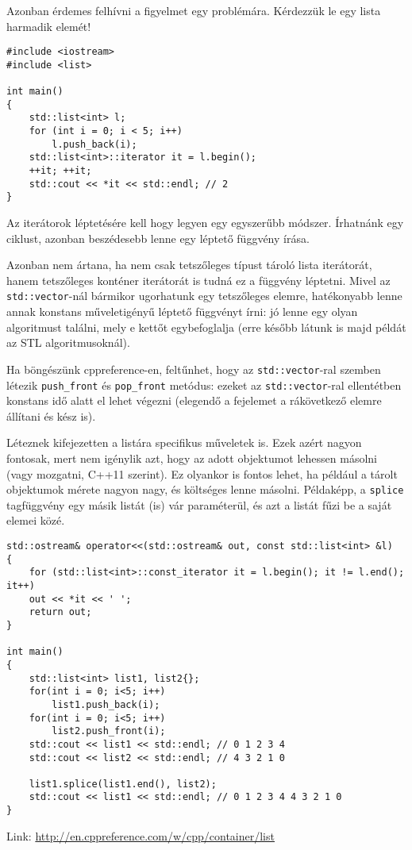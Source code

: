 \documentclass[a4paper,11.5pt,table]{article}
\begin{document}
	Azonban érdemes felhívni a figyelmet egy problémára. Kérdezzük le egy lista harmadik elemét!
	\begin{lstlisting}
#include <iostream>
#include <list>

int main()
{
	std::list<int> l;
	for (int i = 0; i < 5; i++)
		l.push_back(i);
	std::list<int>::iterator it = l.begin();
	++it; ++it;
	std::cout << *it << std::endl; // 2
}
	\end{lstlisting}	
	Az iterátorok léptetésére kell hogy legyen egy egyszerűbb módszer. Írhatnánk egy ciklust, azonban beszédesebb lenne egy léptető függvény írása.
	
	Azonban nem ártana, ha nem csak tetszőleges típust tároló lista iterátorát, hanem tetszőleges konténer iterátorát is tudná ez a függvény léptetni. Mivel az \texttt{std::vector}-nál bármikor ugorhatunk egy tetszőleges elemre, hatékonyabb lenne annak konstans műveletigényű léptető függvényt írni: jó lenne egy olyan algoritmust találni, mely e kettőt egybefoglalja (erre később látunk is majd példát az STL algoritmusoknál).
	
	\medskip
	Ha böngészünk cppreference-en, feltűnhet, hogy az \texttt{std::vector}-ral szemben létezik \texttt{push\_front} és \texttt{pop\_front} metódus: ezeket az \texttt{std::vector}-ral ellentétben konstans idő alatt el lehet végezni (elegendő a fejelemet a rákövetkező elemre állítani és kész is).
	\medskip
	
	Léteznek kifejezetten a listára specifikus műveletek is. Ezek azért nagyon fontosak, mert nem igénylik azt, hogy az adott objektumot lehessen másolni (vagy mozgatni, C++11 szerint). Ez olyankor is fontos lehet, ha például a tárolt objektumok mérete nagyon nagy, és költséges lenne másolni. Példaképp, a \texttt{splice} tagfüggvény egy másik listát (is) vár paraméterül, és azt a listát fűzi be a saját elemei közé.
\begin{lstlisting}
std::ostream& operator<<(std::ostream& out, const std::list<int> &l)
{
	for (std::list<int>::const_iterator it = l.begin(); it != l.end(); it++)
	out << *it << ' ';
	return out;
}	

int main()
{
	std::list<int> list1, list2{};
	for(int i = 0; i<5; i++)
		list1.push_back(i); 
	for(int i = 0; i<5; i++)
		list2.push_front(i);
	std::cout << list1 << std::endl; // 0 1 2 3 4
	std::cout << list2 << std::endl; // 4 3 2 1 0 
	
	list1.splice(list1.end(), list2);
	std::cout << list1 << std::endl; // 0 1 2 3 4 4 3 2 1 0
}
\end{lstlisting}
	Link: \url{http://en.cppreference.com/w/cpp/container/list}
\end{document}
